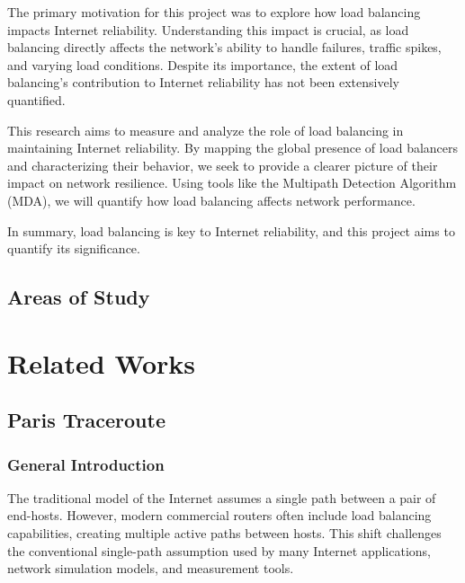 \documentclass[12pt]{cwru_thesis}
\begin{document}
The primary motivation for this project was to explore how load balancing impacts Internet reliability. Understanding this impact is crucial, as load balancing directly affects the network's ability to handle failures, traffic spikes, and varying load conditions. Despite its importance, the extent of load balancing's contribution to Internet reliability has not been extensively quantified.

This research aims to measure and analyze the role of load balancing in maintaining Internet reliability. By mapping the global presence of load balancers and characterizing their behavior, we seek to provide a clearer picture of their impact on network resilience. Using tools like the Multipath Detection Algorithm (MDA), we will quantify how load balancing affects network performance.

In summary, load balancing is key to Internet reliability, and this project aims to quantify its significance. 


\section{Areas of Study} \label{sec:Areassection}












\chapter{Related Works} \label{chap:related}
\section{Paris Traceroute}

\subsection{General Introduction}
The traditional model of the Internet assumes a single path between a pair of end-hosts. However, modern commercial routers often include load balancing capabilities, creating multiple active paths between hosts. This shift challenges the conventional single-path assumption used by many Internet applications, network simulation models, and measurement tools.
\end{document}
